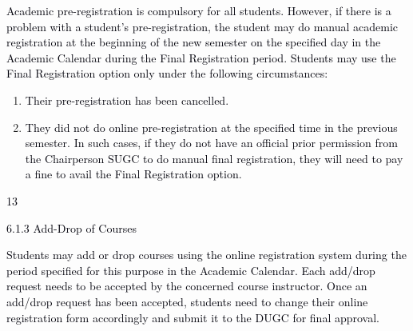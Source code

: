 \documentclass[12pt]{article}
\begin{document}
\vspace{\baselineskip}
\begin{justify}
{\fontsize{10pt}{12.0pt}\selectfont \textcolor[HTML]{00000A}{Academic pre-registration is compulsory for all students. However, if there is a problem with a student's pre-registration, the student may do manual academic registration at the beginning of the new semester on the specified day in the Academic Calendar during the Final Registration period. Students may use the Final Registration option only under the following circumstances:}\par}
\end{justify}\par


\vspace{\baselineskip}
\begin{enumerate}
	\item {\fontsize{10pt}{12.0pt}\selectfont \textcolor[HTML]{00000A}{Their pre-registration has been cancelled.}\par}\par


\vspace{\baselineskip}
	\item {\fontsize{10pt}{12.0pt}\selectfont \textcolor[HTML]{00000A}{They did not do online pre-registration at the specified time in the previous semester. In such cases, if they do not have an official prior permission from the Chairperson SUGC to do manual final registration, they will need to pay a fine to avail the Final Registration option.}\par}
\end{enumerate}\par


\vspace{\baselineskip}

\vspace{\baselineskip}

\vspace{\baselineskip}
\begin{Center}
\textcolor[HTML]{00000A}{13}
\end{Center}\par


\vspace{\baselineskip}
{\fontsize{10pt}{12.0pt}\selectfont \textcolor[HTML]{00000A}{6.1.3 Add-Drop of Courses}\par}\par


\vspace{\baselineskip}
\begin{justify}
{\fontsize{10pt}{12.0pt}\selectfont \textcolor[HTML]{00000A}{Students may add or drop courses using the online registration system during the period specified for this purpose in the Academic Calendar. Each add/drop request needs to be accepted by the concerned course instructor. Once an add/drop request has been accepted, students need to change their online registration form accordingly and submit it to the DUGC for final approval.}\par}
\end{justify}\par
\end{document}
